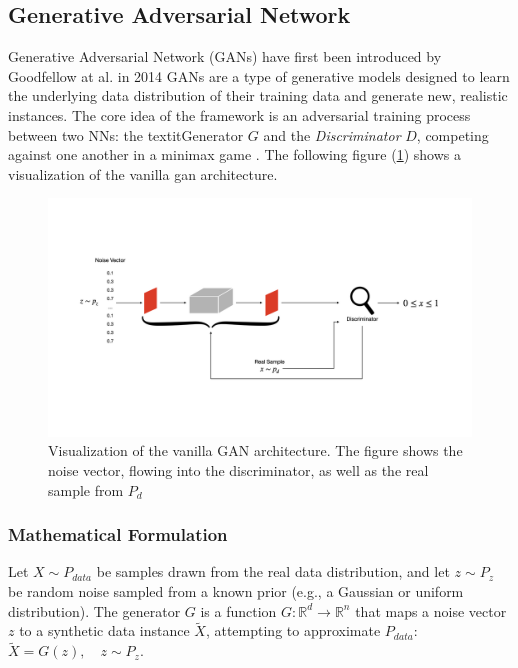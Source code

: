\subsection[Generative Adversarial Network - GAN]{Generative Adversarial Network}\label{theoretical_gan}
Generative Adversarial Network (GANs) have first been introduced by Goodfellow at al. in 2014 \cite{goodfellow2014generativeadversarialnetworks} GANs are a type of generative models designed to learn the underlying data distribution of their training data and generate new, realistic instances. The core idea of the framework is an adversarial training process between two NNs: the textit{Generator} \(G\) and the \textit{Discriminator} \(D\), competing against one another in a minimax game \cite{VonNeumann1928Minimax}. The following figure (\ref{fig:figure_gan_arch}) shows a visualization of the vanilla gan architecture.

\begin{figure}[htbp]
    \centering
    \vspace{-4em}
    \includegraphics[width=.9\textwidth]{abb/arch_gan.png}
    \caption{Visualization of the vanilla GAN architecture. The figure shows the noise vector, flowing into the discriminator, as well as the real sample from \(P_d\)}
    \label{fig:figure_gan_arch}
\end{figure}


\subsubsection{Mathematical Formulation}\label{theoretical_gan_math}
Let \(X \sim P_{data}\) be samples drawn from the real data distribution, and let \(z \sim P_z\) be random noise sampled from a known prior (e.g., a Gaussian or uniform distribution). The generator \(G\) is a function \(G: \mathbb{R}^d \to \mathbb{R}^n\) that maps a noise vector \(z\) to a synthetic data instance \(\tilde{X}\), attempting to approximate \(P_{data}\):\(\tilde{X} = G(z), \quad z \sim P_z.\)

